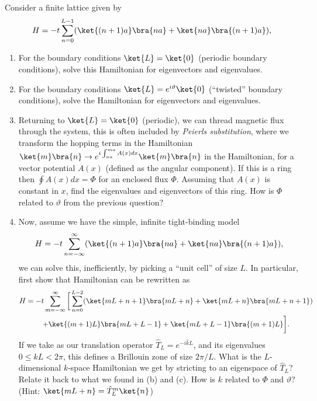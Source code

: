 \documentclass{jhwhw}
\begin{document}
Consider a finite lattice given by
\begin{equation}
  \label{eq:5}
  H = -t \sum_{n=0}^{L-1} (\ket{(n+1)a}\bra{na} + \ket{na}\bra{(n+1)a}),
\end{equation}
\begin{enumerate}
  \item For the boundary conditions $\ket{L} = \ket{0}$ (periodic boundary conditions), solve this Hamiltonian for eigenvectors and eigenvalues.
  \item For the boundary conditions $\ket{L} = e^{i\vartheta} \ket{0}$ (``twisted'' boundary conditions), solve the Hamiltonian for eigenvectors and eigenvalues.
  \item Returning to $\ket{L} =\ket{0}$ (periodic), we can thread magnetic flux through the system, this is often included by \emph{Peierls substitution}, where we transform the hopping terms in the Hamiltonian $\ket{m}\bra{n} \rightarrow e^{i \int_{na}^{m a} A(x) dx} \ket{m}\bra{n}$ in the Hamiltonian, for a vector potential $A(x)$ (defined as the angular component). If this is a ring then $\oint A(x) dx = \Phi$ for an enclosed flux $\Phi$. Assuming that $A(x)$ is constant in $x$, find the eigenvalues and eigenvectors of this ring. How is $\Phi$ related to $\vartheta$ from the previous question?
  \item Now, assume we have the simple, infinite tight-binding model
        \begin{equation}
          \label{eq:7}
            H = -t \sum_{n=-\infty}^{\infty} (\ket{(n+1)a}\bra{na} + \ket{na}\bra{(n+1)a}),
        \end{equation}
        we can solve this, inefficiently, by picking a ``unit cell'' of size $L$. In particular, first show that Hamiltonian can be rewritten as
        \begin{multline}
          \label{eq:8}
          H = -t \sum_{m=-\infty}^{\infty}\bigg[ \sum_{n=0}^{L-2}( \ket{m L + n + 1}\bra{m L + n} + \ket{mL + n}\bra{mL + n + 1} ) \\ + \ket{(m+1)L}\bra{mL + L-1} + \ket{mL + L-1} \bra{(m+1)L}\bigg].
        \end{multline}
        If we take as our translation operator $\hat T_{L} = e^{-i \hat k L}$, and its eigenvalues $0 \leq kL < 2\pi$, this defines a Brillouin zone of size $2\pi/L$. What is the $L$-dimensional $k$-space Hamiltonian we get by stricting to an eigenspace of $\hat T_{L}$? Relate it back to what we found in (b) and (c). How is $k$ related to $\Phi$ and $\vartheta$? (Hint: $\ket{mL + n} = \hat T_{L}^{m} \ket{n}$)
\end{enumerate}
\end{document}
